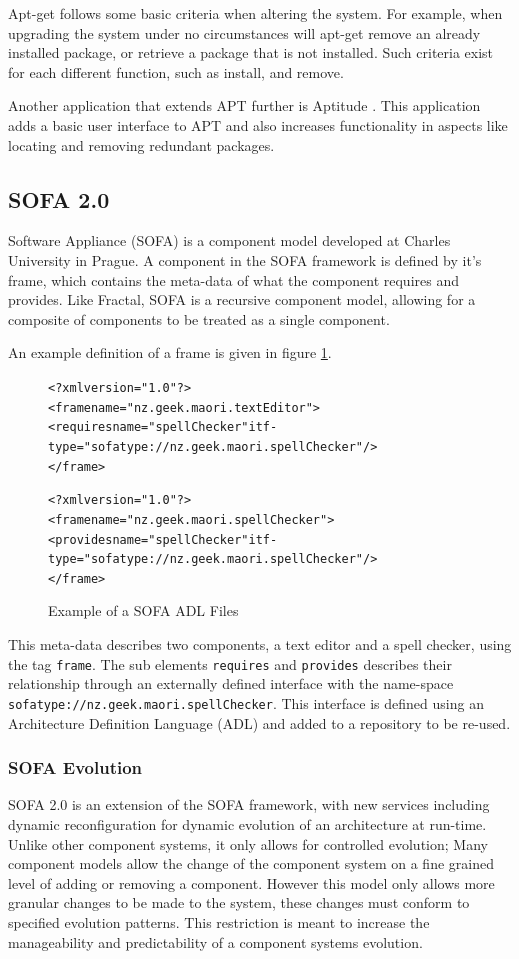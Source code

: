 Apt-get follows some basic criteria when altering the system.
For example, when upgrading the system under no circumstances will apt-get remove an already installed package, or retrieve a package that is not installed. 
Such criteria exist for each different function, such as install, and remove.

Another application that extends APT further is Aptitude \citep{Burrows2005}.
This application adds a basic user interface to APT and also increases functionality in aspects like locating and removing redundant packages. 

\subsection{SOFA 2.0}
Software Appliance (SOFA) is a component model developed at Charles University in Prague.
A component in the SOFA framework is defined by it's frame, which contains the meta-data of what the component requires and provides.
Like Fractal, SOFA is a recursive component model, allowing for a composite of components to be treated as a single component.

An example definition of a frame is given in figure \ref{SOFAmetadata}.

\begin{figure}[htp] 
\begin{center}
\begin{alltt}
<?xml version="1.0"?>
<frame name="nz.geek.maori.textEditor">
  <requires name="spellChecker" itf-type="sofatype://nz.geek.maori.spellChecker"/>
</frame>

<?xml version="1.0"?>
<frame name="nz.geek.maori.spellChecker">
  <provides name="spellChecker" itf-type="sofatype://nz.geek.maori.spellChecker"/>
</frame>
\end{alltt}
  \caption[SOFA ADL files]{Example of a SOFA ADL Files}
  \label{SOFAmetadata}
\end{center}
\end{figure}

This meta-data describes two components, a text editor and a spell checker, using the tag \verb+frame+.
The sub elements \verb+requires+ and \verb+provides+ describes their relationship through an externally defined interface with the name-space \verb+sofatype://nz.geek.maori.spellChecker+.
This interface is defined using an Architecture Definition Language (ADL) and added to a repository to be re-used. 


\subsubsection{SOFA Evolution}
SOFA 2.0 is an extension of the SOFA framework, with new services including dynamic reconfiguration for dynamic evolution of an architecture at run-time. 
Unlike other component systems,
it only allows for controlled evolution; 
Many component models allow the change of the component system on a fine grained level of adding or removing a component.
However this model only allows more granular changes to be made to the system, these changes must conform to specified evolution patterns.
This restriction is meant to increase the manageability and predictability of a component systems evolution. 

